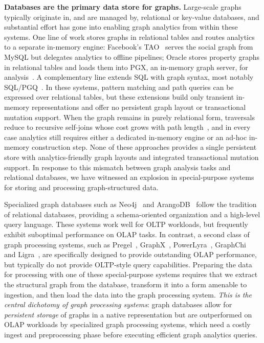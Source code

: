 \textbf{Databases are the primary data store for graphs.} 
Large-scale graphs typically originate in, and are managed by, relational or key-value databases, and substantial effort has gone into enabling graph analytics from within these systems.
One line of work stores graphs in relational tables and routes analytics to a separate in-memory engine: Facebook's TAO~\cite{bronson2013tao} serves the social graph from MySQL but delegates analytics to offline pipelines; Oracle stores property graphs in relational tables and loads them into PGX, an in-memory graph server, for analysis~\cite{OraclePG,WhatIsOracleSpatialGraph:online,hong2015pgx,welc2013graph,graphProcessingRDBMS,hong2013early}.
A complementary line extends SQL with graph syntax, most notably SQL/PGQ~\cite{duckpgq:online}. 
In these systems, pattern matching and path queries can be expressed over relational tables, but these extensions build only transient in-memory representations and offer no persistent graph layout or transactional mutation support.
When the graph remains in purely relational form, traversals reduce to recursive self-joins whose cost grows with path length~\cite{10.1145/3129246,TransitiveClosureBiskupStiefeling1989}, and in every case analytics still requires either a dedicated in-memory engine or an ad-hoc in-memory construction step.
None of these approaches provides a single persistent store with analytics-friendly graph layouts and integrated transactional mutation support.
In response to this mismatch between graph analysis tasks and relational databases, we have witnessed an explosion in special-purpose systems for storing and processing graph-structured data.

Specialized graph databases such as Neo4j~\cite{neo4j} and ArangoDB~\cite{arangodb} follow the tradition of relational databases, providing a schema-oriented organization and a high-level query language.
These systems work well for OLTP workloads, but frequently exhibit suboptimal performance on OLAP tasks.
In contrast, a second class of graph processing systems, such as Pregel~\cite{malewicz2010pregel}, GraphX~\cite{gonzalez2014graphx}, PowerLyra~\cite{powerlyra2019}, GraphChi~\cite{kyrola2012graphchi} and Ligra~\cite{shun2013ligra}, are specifically designed to provide outstanding OLAP performance, but typically do not provide OLTP-style query capabilities.
Preparing the data for processing with one of these special-purpose systems requires that we extract the structural graph from the database, transform it into a form amenable to ingestion, and then load the data into the graph processing system.
\textit{This is the central dichotomy of graph processing systems}: graph databases allow for \emph{persistent storage} of graphs in a native representation but are outperformed on OLAP workloads by specialized graph processing systems, which need a costly ingest and preprocessing phase before executing efficient graph analytics queries.

